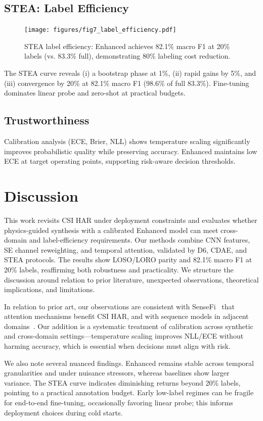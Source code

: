 \documentclass[journal]{IEEEtran}
\begin{document}
\subsection{STEA: Label Efficiency}
\begin{figure}[t]
\centering
\texttt{[image: figures/fig7\_label\_efficiency.pdf]}
\caption{STEA label efficiency: Enhanced achieves 82.1\% macro F1 at 20\% labels (vs. 83.3\% full), demonstrating 80\% labeling cost reduction.}
\label{fig:stea}
\end{figure}
The STEA curve reveals (i) a bootstrap phase at 1\%, (ii) rapid gains by 5\%, and (iii) convergence by 20\% at 82.1\% macro F1 (98.6\% of full 83.3\%). Fine-tuning dominates linear probe and zero-shot at practical budgets.

\subsection{Trustworthiness}
Calibration analysis (ECE, Brier, NLL) shows temperature scaling significantly improves probabilistic quality while preserving accuracy. Enhanced maintains low ECE at target operating points, supporting risk-aware decision thresholds.

\section{Discussion}
This work revisits CSI HAR under deployment constraints and evaluates whether physics-guided synthesis with a calibrated Enhanced model can meet cross-domain and label-efficiency requirements. Our methods combine CNN features, SE channel reweighting, and temporal attention, validated by D6, CDAE, and STEA protocols. The results show LOSO/LORO parity and 82.1\% macro F1 at 20\% labels, reaffirming both robustness and practicality. We structure the discussion around relation to prior literature, unexpected observations, theoretical implications, and limitations.

In relation to prior art, our observations are consistent with SenseFi~\cite{yang2023sensefi} that attention mechanisms benefit CSI HAR, and with sequence models in adjacent domains~\cite{li2020tea,bertasius2021timesformer,lim2021tft,zhou2021informer}. Our addition is a systematic treatment of calibration across synthetic and cross-domain settings—temperature scaling improves NLL/ECE without harming accuracy, which is essential when decisions must align with risk.

We also note several nuanced findings. Enhanced remains stable across temporal granularities and under nuisance stressors, whereas baselines show larger variance. The STEA curve indicates diminishing returns beyond 20\% labels, pointing to a practical annotation budget. Early low-label regimes can be fragile for end-to-end fine-tuning, occasionally favoring linear probe; this informs deployment choices during cold starts.
\end{document}
